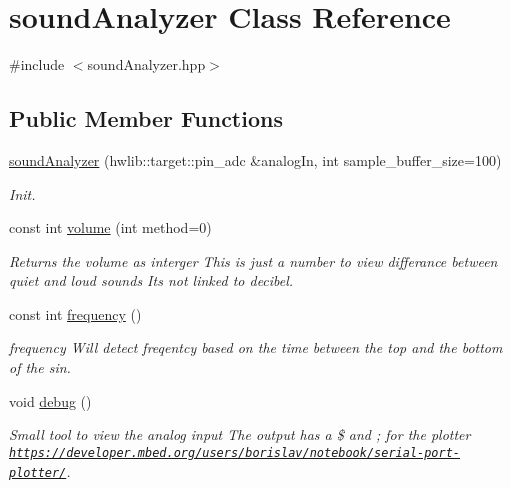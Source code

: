 \hypertarget{classsound_analyzer}{}\section{sound\+Analyzer Class Reference}
\label{classsound_analyzer}


{\ttfamily \#include $<$sound\+Analyzer.\+hpp$>$}

\subsection*{Public Member Functions}
\begin{DoxyCompactItemize}
\item 
\hyperlink{classsound_analyzer_a6d78c426f393464095811648e6a1a923}{sound\+Analyzer} (hwlib\+::target\+::pin\+\_\+adc \&analog\+In, int sample\+\_\+buffer\+\_\+size=100)
\begin{DoxyCompactList}\small\item\em Init. \end{DoxyCompactList}\item 
const int \hyperlink{classsound_analyzer_af0a99b0fa68b2c1462240d0543a79a81}{volume} (int method=0)
\begin{DoxyCompactList}\small\item\em Returns the volume as interger This is just a number to view differance between quiet and loud sounds It\textquotesingle{}s not linked to decibel. \end{DoxyCompactList}\item 
const int \hyperlink{classsound_analyzer_aed5b8c463c0b7a386c619e36aa758427}{frequency} ()
\begin{DoxyCompactList}\small\item\em frequency Will detect freqentcy based on the time between the top and the bottom of the sin. \end{DoxyCompactList}\item 
void \hyperlink{classsound_analyzer_aaedabb7cf70ed32356f04baae1c9e765}{debug} ()
\begin{DoxyCompactList}\small\item\em Small tool to view the analog input The output has a \$ and ; for the plotter \href{https://developer.mbed.org/users/borislav/notebook/serial-port-plotter/}{\tt https\+://developer.\+mbed.\+org/users/borislav/notebook/serial-\/port-\/plotter/}. \end{DoxyCompactList}\end{DoxyCompactItemize}


